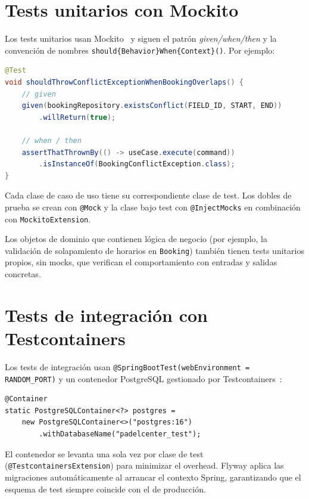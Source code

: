 \section{Tests unitarios con Mockito}
\label{sec:tests_unitarios}

Los tests unitarios usan Mockito~\cite{mockito} y siguen el patrón \textit{given/when/then} y la convención
de nombres \texttt{should\{Behavior\}When\{Context\}()}. Por ejemplo:

\begin{lstlisting}[language=Java]
@Test
void shouldThrowConflictExceptionWhenBookingOverlaps() {
    // given
    given(bookingRepository.existsConflict(FIELD_ID, START, END))
        .willReturn(true);

    // when / then
    assertThatThrownBy(() -> useCase.execute(command))
        .isInstanceOf(BookingConflictException.class);
}
\end{lstlisting}

Cada clase de caso de uso tiene su correspondiente clase de test. Los dobles
de prueba se crean con \texttt{@Mock} y la clase bajo test con \texttt{@InjectMocks}
en combinación con \texttt{MockitoExtension}.

Los objetos de dominio que contienen lógica de negocio (por ejemplo, la
validación de solapamiento de horarios en \texttt{Booking}) también tienen tests
unitarios propios, sin mocks, que verifican el comportamiento con entradas y
salidas concretas.

\section{Tests de integración con Testcontainers}
\label{sec:tests_integracion}

Los tests de integración usan \texttt{@SpringBootTest(webEnvironment = RANDOM\_PORT)}
y un contenedor PostgreSQL gestionado por Testcontainers~\cite{testcontainers}:

\begin{verbatim}
@Container
static PostgreSQLContainer<?> postgres =
    new PostgreSQLContainer<>("postgres:16")
        .withDatabaseName("padelcenter_test");
\end{verbatim}

El contenedor se levanta una sola vez por clase de test
(\texttt{@TestcontainersExtension}) para minimizar el overhead. Flyway aplica
las migraciones automáticamente al arrancar el contexto Spring, garantizando que
el esquema de test siempre coincide con el de producción.

